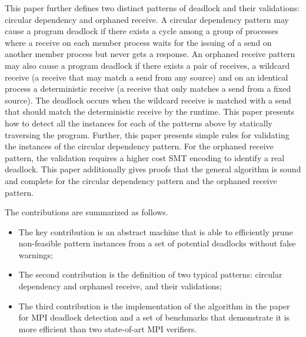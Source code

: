 This paper further defines two distinct patterns of deadlock and their validations: circular dependency and orphaned receive. A circular dependency pattern may cause a program deadlock if there exists a cycle among a group of processes where a receive on each member process waits for the issuing of a send on another member process but never gets a response. An orphaned receive pattern may also cause a program deadlock if there exists a pair of receives, a wildcard receive (a receive that may match a send from any source) and on an identical process a deterministic receive (a receive that only matches a send from a fixed source). The deadlock occurs when the wildcard receive is matched with a send that should match the deterministic receive by the runtime. This paper presents how to detect all the instances for each of the patterns above by statically traversing the program. Further, this paper presents simple rules for validating the instances of the circular dependency pattern. For the orphaned receive pattern, the validation requires a higher cost SMT encoding to identify a real deadlock. 
This paper additionally gives proofs that the general algorithm is sound and complete for the circular dependency pattern and the orphaned receive pattern. 


The contributions are summarized as follows.
\begin{itemize}
\item The key contribution is an abstract machine that is able to efficiently prune non-feasible pattern instances from a set of potential deadlocks without false warnings; 
\item The second contribution is the definition of two typical patterns: circular dependency and orphaned receive, and their validations;
\item The third contribution is the implementation of the algorithm in the paper for MPI deadlock detection and a set of benchmarks that demonstrate it is more efficient than two state-of-art MPI verifiers.
\end{itemize}


